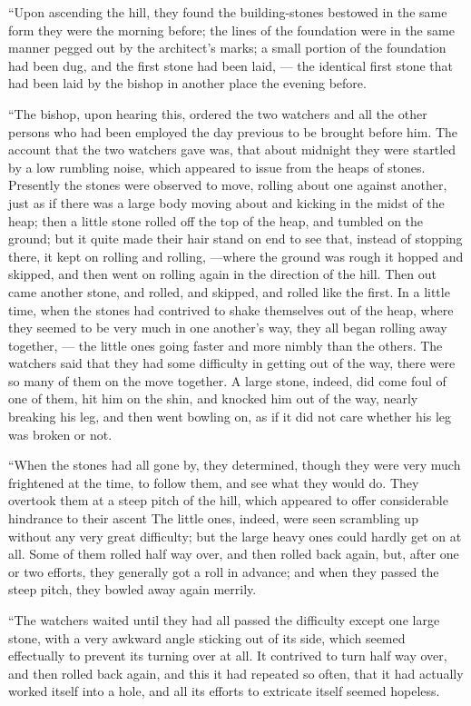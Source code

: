 \documentclass[
  12pt,
  a5paper,
  twoside]{book}
\begin{document}
``Upon ascending the hill, they found the building-stones bestowed in
the same form they were the morning before; the lines of the foundation
were in the same manner pegged out by the architect's marks; a small
portion of the foundation had been dug, and the first stone had been
laid, --- the identical first stone that had been laid by the bishop in
another place the evening before.

``The bishop, upon hearing this, ordered the two watchers and all the
other persons who had been employed the day previous to be brought
before him. The account that the two watchers gave was, that about
midnight they were startled by a low rumbling noise, which appeared to
issue from the heaps of stones. Presently the stones were observed to
move, rolling about one against another, just as if there was a large
body moving about and kicking in the midst of the heap; then a little
stone rolled off the top of the heap, and tumbled on the ground; but it
quite made their hair stand on end to see that, instead of stopping
there, it kept on rolling and rolling, ---where the ground was rough it
hopped and skipped, and then went on rolling again in the direction of
the hill. Then out came another stone, and rolled, and skipped, and
rolled like the first. In a little time, when the stones had contrived
to shake themselves out of the heap, where they seemed to be very much
in one another's way, they all began rolling away together, --- the
little ones going faster and more nimbly than the others. The watchers
said that they had some difficulty in getting out of the way, there were
so many of them on the move together. A large stone, indeed, did come
foul of one of them, hit him on the shin, and knocked him out of the
way, nearly breaking his leg, and then went bowling on, as if it did not
care whether his leg was broken or not.

``When the stones had all gone by, they determined, though they were
very much frightened at the time, to follow them, and see what they
would do. They overtook them at a steep pitch of the hill, which
appeared to offer considerable hindrance to their ascent The little
ones, indeed, were seen scrambling up without any very great difficulty;
but the large heavy ones could hardly get on at all. Some of them rolled
half way over, and then rolled back again, but, after one or two
efforts, they generally got a roll in advance; and when they passed the
steep pitch, they bowled away again merrily.

``The watchers waited until they had all passed the difficulty except
one large stone, with a very awkward angle sticking out of its side,
which seemed effectually to prevent its turning over at all. It
contrived to turn half way over, and then rolled back again, and this it
had repeated so often, that it had actually worked itself into a hole,
and all its efforts to extricate itself seemed hopeless.
\end{document}
